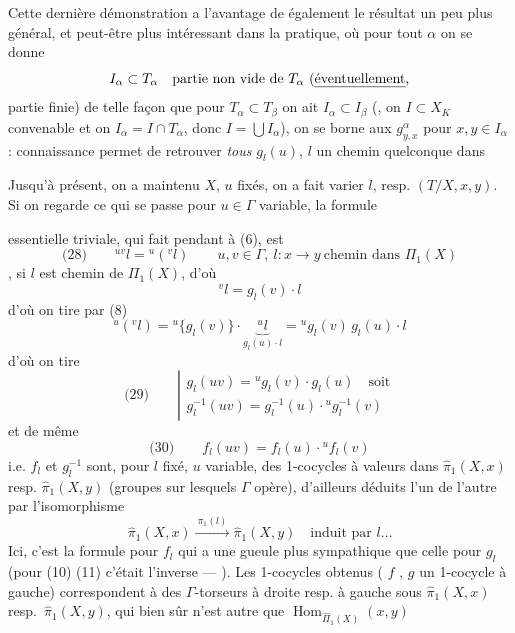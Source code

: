 \documentclass[11pt,a4paper]{article}
\begin{document}
Cette dernière démonstration a l'avantage de  également  le résultat un peu plus général, et peut-être plus intéressant dans la pratique, où pour tout $\alpha$ on se donne
\[
I_\alpha \subset T_\alpha \quad \text{partie non vide de } T_\alpha \ (\text{\uncertain{éventuellement},}
\]
partie finie) de telle façon que pour $T_\alpha \subset T_\beta$ on ait $I_\alpha \subset I_\beta$ (, on  $I \subset X_K$ convenable et on  $I_\alpha = I \cap T_\alpha$, donc $I = \bigcup I_\alpha$), on se borne aux $g^{\alpha}_{y,x}$ pour $x, y \in I_\alpha$ :  connaissance permet de retrouver \emph{tous} \struck{\ill{}} $g_l(u)$, $l$ un chemin quelconque dans

Jusqu'à présent, on a maintenu $X$, $u$ fixés, on a fait varier $l$, resp. $(T/X, x, y)$. Si on regarde ce qui se passe pour $u \in \Gamma$ variable, la formule


essentielle triviale, qui fait pendant à (6), est
\[
\text{(28)}\qquad {}^{uv}l = {}^{u}({}^{v}l) \qquad u, v \in \Gamma,\ l : x \to y \ \text{chemin dans } \Pi_1(X)
\]
, si $l$ est chemin de $\Pi_1(X)$, d'où
\[
{}^{v}l = g_l(v)\cdot l
\]
 d'où on tire par (8)
\[
{}^{u}({}^{v}l) = {}^{u}\{g_l(v)\}\cdot\underbrace{{}^{u}l}_{g_l(u)\cdot l} = {}^{u}g_l(v)\,g_l(u)\cdot l
\]
d'où on tire
\[
\text{(29)}\qquad
\left|\begin{array}{l}
g_l(uv) = {}^{u}g_l(v)\cdot g_l(u) \quad\text{soit}\\
g_l^{-1}(uv) = g_l^{-1}(u)\cdot{}^{u}g_l^{-1}(v)
\end{array}\right.
\]
et de même
\[
\text{(30)}\qquad f_l(uv) = f_l(u)\cdot{}^{u}f_l(v)
\]
i.e. $f_l$ et $g_l^{-1}$ sont, pour $l$ fixé, $u$ variable, des 1-cocycles  à valeurs dans $\widehat{\pi}_1(X,x)$ resp. $\widehat{\pi}_1(X,y)$ (groupes sur lesquels $\Gamma$ opère), d'ailleurs déduits l'un de l'autre par l'isomorphisme
\[
\widehat{\pi}_1(X,x) \xrightarrow{\ \pi_1(l)\ } \widehat{\pi}_1(X,y) \quad \text{induit par } l \ldots
\]
Ici, c'est la formule pour $f_l$ qui a une gueule plus sympathique que celle pour $g_l$ (pour (10) (11) c'était l'inverse — \struck{\ill{}} ). Les 1-cocycles obtenus (\struck{\ill{}} $f$ , $g$ un 1-cocycle à gauche) correspondent à des $\Gamma$-torseurs à droite resp. à gauche sous $\widehat{\pi}_1(X,x)$ resp.\ $\widehat{\pi}_1(X,y)$, qui bien sûr n'est autre que $\operatorname{Hom}_{\widehat{\Pi}_1(X)}(x,y)$
\end{document}
